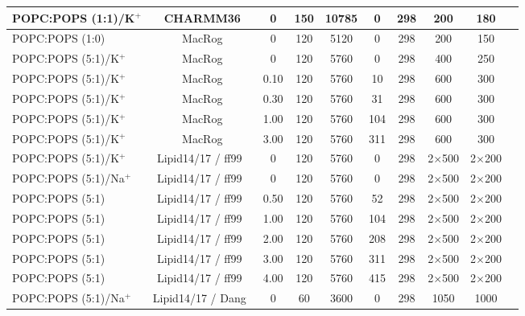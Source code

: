 \documentclass[aps,prl,superscriptaddress,twocolumn]{revtex4}
\begin{document}
\begin{table}[tb]
\begin{tabular}{lccccccccc}
POPC:POPS (1:1)/K$^{+}$  & CHARMM36 \cite{klauda10,venable13}  & 0  & 150  & 10785  & 0  & 298  & 200  & 180  & \cite{POPC1POPS1noCaClCHARMM} \tabularnewline
\hline 
POPC:POPS (1:0)  & MacRog \cite{maciejewski14}  & 0  & 120 & 5120  & 0  & 298  & 200  & 150  & \cite{macrogPOPC298K} \tabularnewline
POPC:POPS (5:1)/K$^{+}$  & MacRog \cite{maciejewski14}  & 0  & 120 & 5760  & 0  & 298  & 400 & 250 &  \cite{POPCpopsMACROG}\tabularnewline
POPC:POPS (5:1)/K$^{+}$  & MacRog \cite{maciejewski14}  & 0.10  & 120  & 5760  & 10  & 298  & 600  & 300  & \cite{POPCpopsMACROG} \tabularnewline
POPC:POPS (5:1)/K$^{+}$  & MacRog \cite{maciejewski14}  & 0.30  & 120  & 5760  & 31  & 298  & 600  & 300  & \cite{POPCpopsMACROG} \tabularnewline
POPC:POPS (5:1)/K$^{+}$  & MacRog \cite{maciejewski14}  & 1.00  & 120 & 5760  & 104  & 298  & 600  & 300  & \cite{POPCpopsMACROG} \tabularnewline
POPC:POPS (5:1)/K$^{+}$  & MacRog \cite{maciejewski14}  & 3.00  & 120 & 5760  & 311  & 298  & 600 & 300 & \cite{POPCpopsMACROG}\tabularnewline
\hline 
POPC:POPS (5:1)/K$^{+}$  & Lipid14/17 \cite{dickson14,gould18} / ff99~\cite{aqvist90}  & 0  & 120  & 5760  & 0  & 298  & 2$\times$500  & 2$\times$200  & \cite{POPCpopsLIPID17withKCI} \tabularnewline
POPC:POPS (5:1)/Na$^{+}$  & Lipid14/17 \cite{dickson14,gould18} / ff99~\cite{aqvist90}  & 0  & 120 & 5760  & 0  & 298  & 2$\times$500  & 2$\times$200  & \cite{POPCpopsLIPID17withNaCI} \tabularnewline
POPC:POPS (5:1)  & Lipid14/17 \cite{dickson14,gould18} / ff99~\cite{aqvist90}  & 0.50  & 120 & 5760  & 52  & 298  & 2$\times$500  & 2$\times$200  & \cite{POPCpopsLIPID17withCaCl} \tabularnewline
POPC:POPS (5:1)  & Lipid14/17 \cite{dickson14,gould18} / ff99~\cite{aqvist90}  & 1.00  & 120  & 5760  & 104  & 298  & 2$\times$500  & 2$\times$200  & \cite{POPCpopsLIPID17withCaCl} \tabularnewline
POPC:POPS (5:1)  & Lipid14/17 \cite{dickson14,gould18} / ff99~\cite{aqvist90}  & 2.00  & 120  & 5760  & 208  & 298  & 2$\times$500  & 2$\times$200  & \cite{POPCpopsLIPID17withCaCl} \tabularnewline
POPC:POPS (5:1)  & Lipid14/17 \cite{dickson14,gould18} / ff99~\cite{aqvist90}  & 3.00  & 120 & 5760  & 311  & 298  & 2$\times$500  & 2$\times$200  & \cite{POPCpopsLIPID17withCaCl} \tabularnewline
POPC:POPS (5:1)  & Lipid14/17 \cite{dickson14,gould18} / ff99~\cite{aqvist90}  & 4.00  & 120  & 5760  & 415  & 298  & 2$\times$500  & 2$\times$200  & \cite{POPCpopsLIPID17withCaCl} \tabularnewline
POPC:POPS (5:1)/Na$^{+}$  & Lipid14/17 \cite{dickson14,gould18} / Dang~\cite{smith94,dang06}  & 0  & 60 & 3600  & 0  & 298  & 1050  & 1000  & \cite{lipid17_cacl_series} \tabularnewline

\end{tabular}
\end{table}
\end{document}
